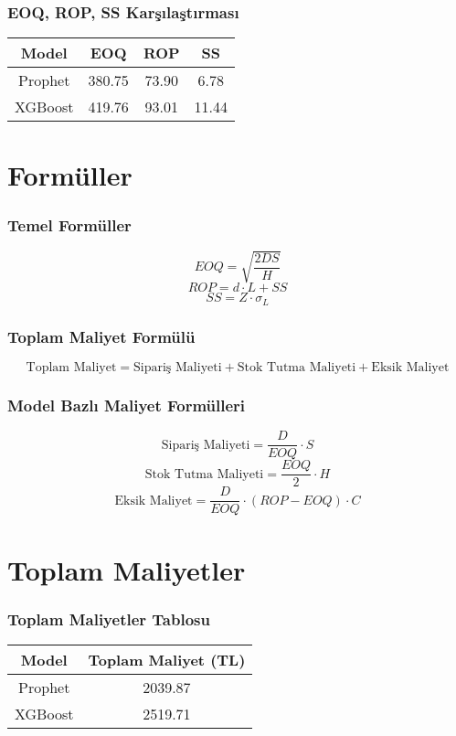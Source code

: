 \documentclass[12pt]{beamer}
\begin{document}
\begin{frame}
  \frametitle{EOQ, ROP, SS Karşılaştırması}
  \begin{tabular}{c|c|c|c}
    \textbf{Model} & EOQ & ROP & SS \\ \hline
    Prophet        & 380.75 & 73.90 & 6.78 \\
    XGBoost        & 419.76 & 93.01 & 11.44 \\
  \end{tabular}
\end{frame}

\section{Formüller}
\begin{frame}
  \frametitle{Temel Formüller}
  \begin{equation}
    EOQ = \sqrt{\frac{2DS}{H}}
  \end{equation}
  \begin{equation}
    ROP = d \cdot L + SS
  \end{equation}
  \begin{equation}
    SS = Z \cdot \sigma_L
  \end{equation}
\end{frame}

\begin{frame}
  \frametitle{Toplam Maliyet Formülü}
  \begin{equation}
    \text{Toplam Maliyet} = \text{Sipariş Maliyeti} + \text{Stok Tutma Maliyeti} + \text{Eksik Maliyet}
  \end{equation}
\end{frame}

\begin{frame}
  \frametitle{Model Bazlı Maliyet Formülleri}
  \begin{equation}
    \text{Sipariş Maliyeti} = \frac{D}{EOQ} \cdot S
  \end{equation}
  \begin{equation}
    \text{Stok Tutma Maliyeti} = \frac{EOQ}{2} \cdot H
  \end{equation}
  \begin{equation}
    \text{Eksik Maliyet} = \frac{D}{EOQ} \cdot (ROP - EOQ) \cdot C
  \end{equation}
\end{frame}

\section{Toplam Maliyetler}
\begin{frame}
  \frametitle{Toplam Maliyetler Tablosu}
  \begin{tabular}{c|c}
    \textbf{Model} & \textbf{Toplam Maliyet (TL)} \\ \hline
    Prophet        & 2039.87 \\
    XGBoost        & 2519.71 \\
  \end{tabular}
\end{frame}
\end{document}
